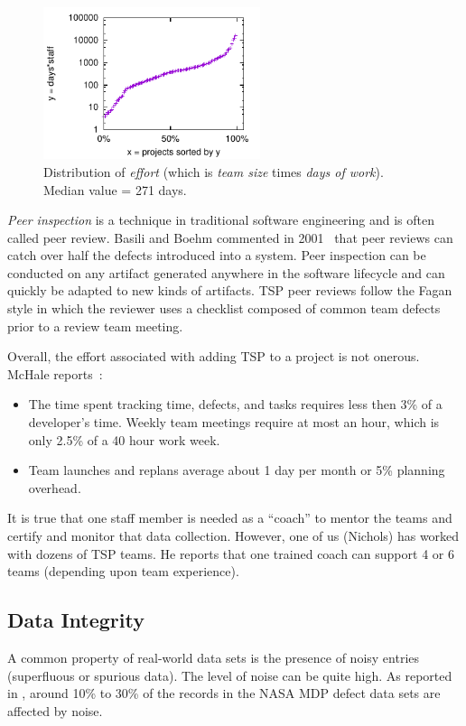 \documentclass[smallcondesed]{svjour3}
\newcommand{\bi}{\begin{itemize}}%
\newcommand{\ei}{\end{itemize}}
\begin{document}
\begin{figure}
\begin{center} 
\includegraphics[width=2.5in]{dom.pdf}
\end{center} 
\caption{Distribution of 
{\em effort} (which is
{\em team size} times
{\em days of work}). Median
value = 271 days.}\label{fig:dist}
\end{figure}

{\em Peer inspection} is a  technique in
traditional software engineering and is often called peer review.
 Basili and Boehm   commented in 2001~\cite{boehm01} 
that peer reviews can catch over half the defects introduced into a system.
Peer inspection can be conducted on any artifact generated anywhere in the software
lifecycle and can quickly be adapted to new kinds of artifacts. TSP peer reviews follow the Fagan style in which the reviewer uses a checklist composed of common team defects prior to a review team meeting. 
 
Overall, the   effort associated with adding TSP to a project is not onerous. McHale reports~\cite{mchale02}:
\bi
\item
 The time spent  tracking time, defects, and tasks requires less then 3\% of a developer's time. Weekly team meetings  require at most an hour, which is
only 2.5\% of a 40 hour work week. 
\item
Team launches and replans average about 1 day per month or 5\% planning overhead.
\ei
It is true that one staff member is needed as a ``coach'' to mentor the teams
and certify and monitor that data collection. However, one of us (Nichols) has worked with dozens of TSP teams. He reports that one  trained coach can support 4 or 6 teams (depending upon team experience).
 
 
\subsection{Data Integrity}

A common property of real-world data sets is the presence
of noisy entries (superfluous  or spurious data). 
The level of noise can be quite high. As reported
in \cite{shepperd12}, around
10\% to 30\%
of the records in the NASA MDP defect data sets are
affected by noise. 
\end{document}
